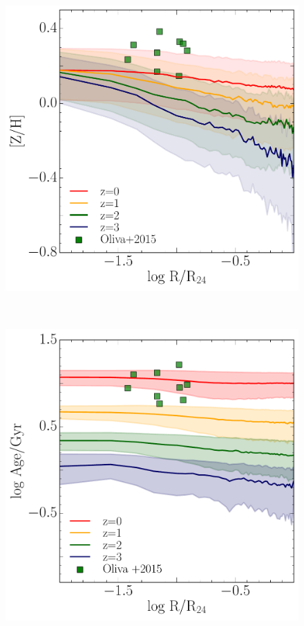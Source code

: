 \begin{figure}[H]
 \includegraphics[height=12cm, width=13cm]{../al_final/estrellas/stack/ultimoMETALICIDADES-PROG_zsunasplund.pdf}
\end{figure}

\begin{figure}[H]
 \includegraphics[height=12cm, width=13cm]{../al_final/estrellas/stack/ultimoEDADES-PROG_olivA.pdf}
\end{figure}


